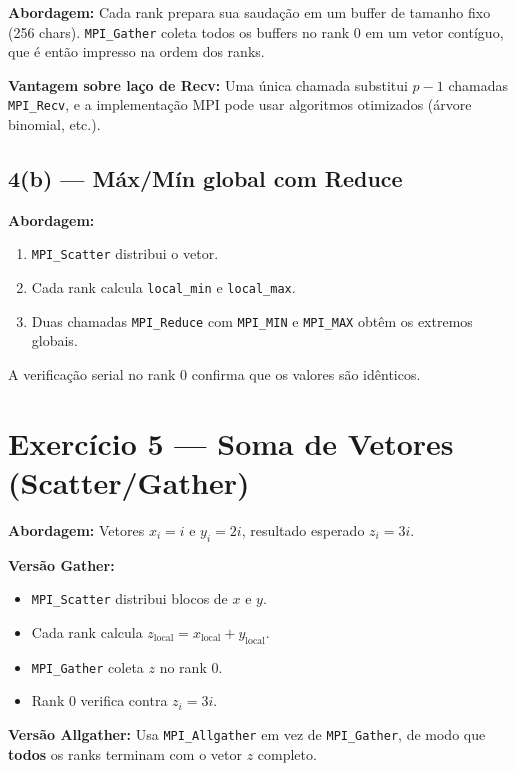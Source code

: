 \documentclass[12pt,a4paper]{article}
\begin{document}
\textbf{Abordagem:} Cada rank prepara sua saudação em um buffer de tamanho fixo
(256 chars). \texttt{MPI\_Gather} coleta todos os buffers no rank 0 em um vetor
contíguo, que é então impresso na ordem dos ranks.

\textbf{Vantagem sobre laço de Recv:} Uma única chamada substitui $p-1$ chamadas
\texttt{MPI\_Recv}, e a implementação MPI pode usar algoritmos otimizados (árvore
binomial, etc.).

\subsection{4(b) — Máx/Mín global com Reduce}

\textbf{Abordagem:}
\begin{enumerate}
    \item \texttt{MPI\_Scatter} distribui o vetor.
    \item Cada rank calcula \texttt{local\_min} e \texttt{local\_max}.
    \item Duas chamadas \texttt{MPI\_Reduce} com \texttt{MPI\_MIN} e \texttt{MPI\_MAX}
    obtêm os extremos globais.
\end{enumerate}

A verificação serial no rank 0 confirma que os valores são idênticos.

\section{Exercício 5 — Soma de Vetores (Scatter/Gather)}

\textbf{Abordagem:} Vetores $x_i = i$ e $y_i = 2i$, resultado esperado $z_i = 3i$.

\textbf{Versão Gather:}
\begin{itemize}
    \item \texttt{MPI\_Scatter} distribui blocos de $x$ e $y$.
    \item Cada rank calcula $z_{\text{local}} = x_{\text{local}} + y_{\text{local}}$.
    \item \texttt{MPI\_Gather} coleta $z$ no rank 0.
    \item Rank 0 verifica contra $z_i = 3i$.
\end{itemize}

\textbf{Versão Allgather:} Usa \texttt{MPI\_Allgather} em vez de \texttt{MPI\_Gather},
de modo que \textbf{todos} os ranks terminam com o vetor $z$ completo.
\end{document}

